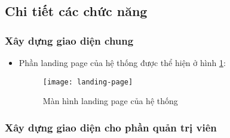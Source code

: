 \documentclass[../Thesis.tex]{subfiles}
\begin{document}
    \subsection{Chi tiết các chức năng}
        \subsubsection{Xây dựng giao diện chung}
        \label{subsubsec:xay-dung-giao-dien-chung}
            \begin{itemize}
                \item Phần landing page của hệ thống được thể hiện ở hình \ref{fig:landing-page}:
                \begin{figure}[hbt!]
                    \centering\texttt{[image: landing-page]}
                    \caption{Màn hình landing page của hệ thống}
                    \label{fig:landing-page}
                \end{figure}
                \FloatBarrier

            \end{itemize}

        \subsubsection{Xây dựng giao diện cho phần quản trị viên}
        \label{subsubsec:xay-dung-giao-dien-admin}
        
\end{document}

